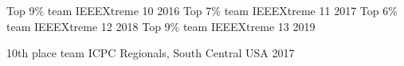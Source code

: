 



\begin{cvhonors}

  \cvhonor
    {Top 9\% team} %
    {IEEEXtreme 10} %
    {} %
    {2016} %
   \cvhonor
    {Top 7\% team} %
    {IEEEXtreme 11} %
    {} %
    {2017} %
   \cvhonor
    {Top 6\% team} %
    {IEEEXtreme 12} %
    {} %
    {2018} %
   \cvhonor
    {Top 9\% team} %
    {IEEEXtreme 13} %
    {} %
    {2019} %

\end{cvhonors}




\begin{cvhonors}

  \cvhonor
    {10th place team} %
    {ICPC Regionals, South Central USA} %
    {} %
    {2017} %

\end{cvhonors}
